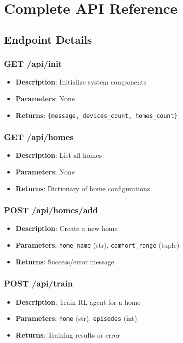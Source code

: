 \documentclass[12pt,a4paper]{article}
\begin{document}
\section{Complete API Reference}

\subsection{Endpoint Details}

\subsubsection{GET /api/init}
\begin{itemize}[leftmargin=*]
    \item \textbf{Description}: Initialize system components
    \item \textbf{Parameters}: None
    \item \textbf{Returns}: \texttt{\{message, devices\_count, homes\_count\}}
\end{itemize}

\subsubsection{GET /api/homes}
\begin{itemize}[leftmargin=*]
    \item \textbf{Description}: List all homes
    \item \textbf{Parameters}: None
    \item \textbf{Returns}: Dictionary of home configurations
\end{itemize}

\subsubsection{POST /api/homes/add}
\begin{itemize}[leftmargin=*]
    \item \textbf{Description}: Create a new home
    \item \textbf{Parameters}: \texttt{home\_name} (str), \texttt{comfort\_range} (tuple)
    \item \textbf{Returns}: Success/error message
\end{itemize}

\subsubsection{POST /api/train}
\begin{itemize}[leftmargin=*]
    \item \textbf{Description}: Train RL agent for a home
    \item \textbf{Parameters}: \texttt{home} (str), \texttt{episodes} (int)
    \item \textbf{Returns}: Training results or error
\end{itemize}
\end{document}
